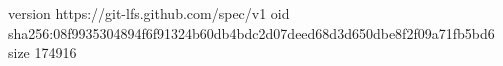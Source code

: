 version https://git-lfs.github.com/spec/v1
oid sha256:08f9935304894f6f91324b60db4bdc2d07deed68d3d650dbe8f2f09a71fb5bd6
size 174916
